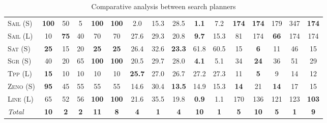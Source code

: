 \documentclass[11pt]{article}
\begin{document}
\begin{table*}[tb]
{\begin{tabular}{|l||ccccc||ccccc||ccccc||}
\textsc{Sail} (S)&\textbf{100}&50&5&\textbf{100}&\textbf{100}&2.0&15.3&28.5&\textbf{1.1}&7.2&\textbf{174}&\textbf{174}&179&347&\textbf{174}\\
\textsc{Sail} (L)&10&\textbf{75}&40&70&70&27.6&29.3&20.8&\textbf{9.7}&15.3&81&174&\textbf{66}&174&174\\
\textsc{Sat} (S)&\textbf{25}&15&20&\textbf{25}&\textbf{25}&26.4&32.6&\textbf{23.3}&61.8&60.5&15&\textbf{6}&11&46&15\\
\textsc{Sgr} (S)&40&20&65&\textbf{100}&\textbf{100}&20.5&29.7&28.0&\textbf{4.1}&5.1&34&\textbf{24}&36&51&29\\
\textsc{Tpp} (L)&\textbf{15}&10&10&10&10&\textbf{25.7}&27.0&26.7&27.2&27.3&11&\textbf{5}&9&14&12\\
\textsc{Zeno} (S)&\textbf{95}&45&55&55&55&14.6&30.4&\textbf{13.5}&14.9&15.3&\textbf{14}&21&\textbf{14}&17&15\\
\textsc{Line} (L)&65&52&56&\textbf{100}&\textbf{100}&21.6&35.5&19.8&\textbf{0.9}&1.1&170&136&121&123&\textbf{103}
\\\hline
\textit{Total}&\textbf{10}&\textbf{2}&\textbf{2}&\textbf{11}&\textbf{8}&\textbf{4}&\textbf{1}&\textbf{4}&\textbf{10}&\textbf{1}&\textbf{5}&\textbf{10}&\textbf{5}&\textbf{1}&\textbf{9}\\\hline

        \end{tabular}}
        \caption{Comparative analysis between search planners}
        \label{tab:search}
        \end{table*}
        
\end{document}

